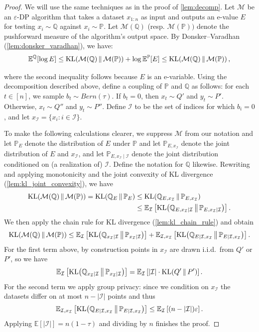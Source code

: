 \documentclass{article}
\DeclareMathOperator{\KLop}{KL}
\newcommand{\KL}[2]{%
  \mathchoice
    {\KLop\!\left(#1\,\middle\|\,#2\right)}%
    {\KLop(#1\,\Vert\,#2)}%
    {\KLop(#1\,\Vert\,#2)}%
    {\KLop(#1\,\Vert\,#2)}%
}
\newcommand{\Null}{\mathbb{P}}
\newcommand{\E}{\mathbb{E}}
\newcommand{\Alt}{\mathbb{Q}}
\newcommand{\M}{\mathcal{M}}
\newcommand{\eps}{\varepsilon}
\newcommand{\cI}{\mathcal{I}}
\begin{document}
\begin{proof}
We will use the same techniques as in the proof of \cref{lem:decomp}. 
Let $\mathcal{M}$ be an $\eps$-DP algorithm that takes a dataset $x_{1:n}$ as input and outputs an e-value $E$ for testing $x_i \sim \Alt$ against $x_i \sim \Null$. Let $\M(\Alt)$ (resp. $\M(\Null))$ denote the pushforward measure of the algorithm's output space. By Donsker--Varadhan (\cref{lem:donsker_varadhan}), we have:
\begin{equation*}
    \E^\Alt[\log E] \leq \KL{\M(\Alt)}{\M(\Null)} + \log \E^\Null[E] \leq \KL{\M(\Alt)}{\M(\Null)},
\end{equation*}

where the second inequality follows because $E$ is an e-variable. Using the decomposition described above, define a coupling of $\Null$ and $\Alt$ as follows: for each $t \in [n]$, we sample $b_t \sim Bern(\tau)$. If $b_t=0$, then $x_t \sim Q'$ and $y_t \sim P'$. Otherwise, $x_t \sim Q''$ and $y_t \sim  P''$. Define $\mathcal{I}$ to be the set of indices for which $b_i=0$, and let $x_\mathcal{I} = \lbrace x_i : i \in \mathcal{I} \rbrace$. %


    To make the following calculations clearer, we suppress $\M$ from our notation and let $\Null_{E}$ denote the distribution of $E$ under $\Null$ and let $\Null_{E,x_\cI}$ denote the joint distribution of $E$ and $x_{\cI}$, and let $\Null_{E,x_\cI\mid \cI}$ denote the joint distribution conditioned on (a realization of) $\cI$.
    Define the notation for $\Alt$ likewise.
    Rewriting and applying monotonicity and the joint convexity of KL divergence (\cref{lem:kl_joint_convexity}), we have
    \begin{align*}
        \KL{\M(\Alt)}{\M(\Null)} 
            = \KL{\Alt_E}{\Null_E} 
            &\le \KL{\Alt_{E,x_\cI}}{\Null_{E,x_\cI}} \\
            &\le \E_\cI\left[ \KL{\Alt_{E, x_\cI\mid \cI}}{\Null_{E, x_\cI\mid \cI}}\right].
    \end{align*}
    We then apply the chain rule for KL divergence (\cref{lem:kl_chain_rule}) and obtain
    \begin{align*}
        \KL{\M(\Alt)}{\M(\Null)} \le \E_\cI\left[ \KL{\Alt_{x_\cI\mid \cI}}{\Null_{x_\cI\mid \cI}}\right]
            +\E_{\cI,x_\cI}\left[ \KL{\Alt_{E\mid \cI, x_\cI}}{\Null_{E\mid \cI,x_\cI}}\right].
    \end{align*}
    For the first term above, by construction points in $x_\cI$ are drawn i.i.d.\ from $Q'$ or $P'$, so we have
    \[
        \E_\cI\left[ \KL{\Alt_{x_\cI\mid \cI}}{\Null_{x_\cI\mid \cI}}\right] = \E_\cI\left[|\cI|\cdot \KL{Q'}{P'}\right].
    \]
    For the second term we apply group privacy: since we condition on $x_\cI$ the datasets differ on at most $n-|\cI|$ points and thus
    \[
        \E_{\cI,x_\cI}\left[ \KL{\Alt_{E\mid \cI, x_\cI}}{\Null_{E\mid \cI,x_\cI}}\right]
            \le \E_{\cI}\left[ (n - |\cI|)\eps\right].
    \]
    Applying $\E[|\cI|] = n(1-\tau)$ and dividing by $n$ finishes the proof.
\end{proof}
\end{document}
